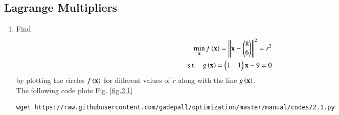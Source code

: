 \documentclass[journal,12pt,twocolumn]{IEEEtran}
\renewcommand\thesection{\arabic{section}}
\begin{document}
\subsection{Lagrange Multipliers}
\begin{enumerate}[label=\thesection.\arabic*,ref=\thesection.\theenumi]

\item
	\label{convex_code}
Find
\begin{align}
\label{eq2_1_circ}
	\min_{\mbf{x}}f\brak{\mbf{x}} = \norm{\vec{x}-\myvec{8\\6}}^2 = r^2 \\
\text{s.t.} \quad 	g\brak{\mbf{x}} = \myvec{1 & 1}\vec{x} - 9 = 0\label{eq2_1_line}
\end{align}
by plotting the circles $f\left(\mathbf{x}\right)$
%
%
for different values of $r$ along with the line $g\left(\mathbf{x}\right)$.
%
%
\\
\solution 
The following code plots Fig. \ref{fig.2.1}	

%	
\begin{lstlisting}
wget https://raw.githubusercontent.com/gadepall/optimization/master/manual/codes/2.1.py
\end{lstlisting}


\end{enumerate}
\end{document}
